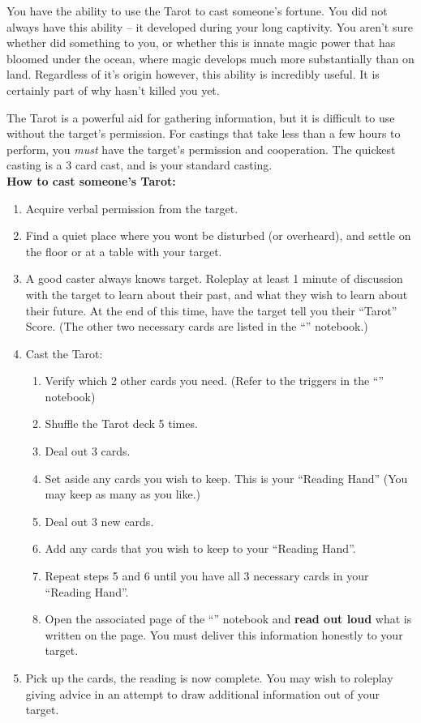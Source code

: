 \documentclass[green]{NeptuneBall}
\begin{document}
\name{\gTarot{}}

You have the ability to use the Tarot to cast someone's fortune. You did not always have this ability -- it developed during your long captivity. You aren't sure whether \cWitch{\MYname} did something to you, or whether this is innate magic power that has bloomed under the ocean, where magic develops much more substantially than on land. Regardless of it's origin however, this ability is incredibly useful. It is certainly part of why \cWitch{\MYname} hasn't killed you yet.

The Tarot is a powerful aid for gathering information, but it is difficult to use without the target's permission. For castings that take less than a few hours to perform, you \emph{must} have the target's permission and cooperation. The quickest casting is a 3 card cast, and is your standard casting.\\

{\bf How to cast someone's Tarot:} %
\begin{enumerate}
  \item Acquire verbal permission from the target.
  \item Find a quiet place where you wont be disturbed (or overheard), and settle on the floor or at a table with your target.
  \item A good caster always knows \cSlave{\their} target. Roleplay at least 1 minute of discussion with the target to learn about their past, and what they wish to learn about their future. At the end of this time, have the target tell you their ``Tarot'' Score. (The other two necessary cards are listed in the ``\mTarot{\MYname}'' notebook.)
  \item Cast the Tarot:
  \begin{enumerate}
    \item Verify which 2 other cards you need. (Refer to the triggers in the ``\mTarot{\MYname}'' notebook)
    \item Shuffle the Tarot deck 5 times.
    \item Deal out 3 cards.
    \item Set aside any cards you wish to keep. This is your ``Reading Hand'' (You may keep as many as you like.)
    \item Deal out 3 new cards.
    \item Add any cards that you wish to keep to your ``Reading Hand''.
    \item Repeat steps 5 and 6 until you have all 3 necessary cards in your ``Reading Hand''.
    \item Open the associated page of the ``\mTarot{\MYname}'' notebook and {\bf read out loud} what is written on the page. You must deliver this information honestly to your target.
  \end{enumerate}
  \item Pick up the cards, the reading is now complete. You may wish to roleplay giving advice in an attempt to draw additional information out of your target.
\end{enumerate}
\end{document}
